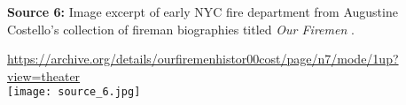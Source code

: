 \textbf{Source 6:} Image excerpt of early NYC fire department from Augustine Costello's collection of fireman biographies titled \emph{Our Firemen} \cite{coste87}.

\url{https://archive.org/details/ourfiremenhistor00cost/page/n7/mode/1up?view=theater} \\

\texttt{[image: source\_6.jpg]} \\